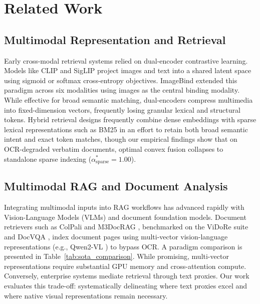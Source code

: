 \section{Related Work}
\label{sec:related_work}

\subsection{Multimodal Representation and Retrieval}
Early cross-modal retrieval systems relied on dual-encoder contrastive learning. Models like CLIP \cite{radford2021clip} and SigLIP \cite{zhai2023siglip} project images and text into a shared latent space using sigmoid or softmax cross-entropy objectives. ImageBind \cite{girdhar2023imagebind} extended this paradigm across six modalities using images as the central binding modality. While effective for broad semantic matching, dual-encoders compress multimedia into fixed-dimension vectors, frequently losing granular lexical and structural tokens. Hybrid retrieval designs frequently combine dense embeddings with sparse lexical representations such as BM25 \cite{robertson2009bm25, robertson1995okapi} in an effort to retain both broad semantic intent and exact token matches, though our empirical findings show that on OCR-degraded verbatim documents, optimal convex fusion collapses to standalone sparse indexing ($\alpha_{\text{sparse}}^* = 1.00$).

\subsection{Multimodal RAG and Document Analysis}
Integrating multimodal inputs into RAG workflows has advanced rapidly with Vision-Language Models (VLMs) and document foundation models. Document retrievers such as ColPali \cite{faysse2024colpali} and M3DocRAG \cite{cho2024m3docrag}, benchmarked on the ViDoRe suite \cite{faysse2024colpali} and DocVQA \cite{mathew2021docvqa}, index document pages using multi-vector vision-language representations (e.g., Qwen2-VL \cite{wang2024qwen2vl}) to bypass OCR. A paradigm comparison is presented in Table~\ref{tab:sota_comparison}. While promising, multi-vector representations require substantial GPU memory and cross-attention compute. Conversely, enterprise systems \cite{patel2025multimodal, joshi2024multimodel} mediate retrieval through text proxies. Our work evaluates this trade-off: systematically delineating where text proxies excel and where native visual representations remain necessary.



